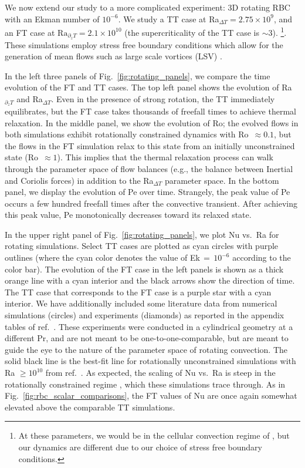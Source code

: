 \documentclass[aps, pre, onecolumn, nofootinbib, notitlepage, groupedaddress, amsfonts, amssymb, amsmath, longbibliography, superscriptaddress]{revtex4-1}
\newcommand{\ea}[1]{{\color{red} #1}}
\begin{document}
We now extend our study to a more complicated experiment: 3D rotating RBC with an Ekman number of $10^{-6}$.
We study a TT case at Ra$_{\Delta T} = 2.75\times 10^9$, and an FT case at $\text{Ra}_{\partial_z T} = 2.1 \times 10^{10}$ (the supercriticality of the TT case is $\sim 3$).
\footnote{\ea{At these parameters, we would be in the cellular convection regime of \citet{stellmach&all2014}, but our dynamics are different due to our choice of stress free boundary conditions.
}}.
These simulations employ stress free boundary conditions which allow for the generation of mean flows such as large scale vortices (LSV) \ea{\citep{stellmach&all2014, rubio&all2014, guervilly&all2014, guervilly&hughes2017, favier&all2014, favier&all2019, couston&all2019}}.

In the left three panels of Fig.~\ref{fig:rotating_panels}, we compare the time evolution of the FT and TT cases.
The top left panel shows the evolution of Ra$_{\partial_z T}$ and Ra$_{\Delta T}$.
Even in the presence of strong rotation, the TT immediately equilibrates, but the FT case takes thousands of freefall times to achieve thermal relaxation.
In the middle panel, we show the evolution of Ro; the evolved flows in both simulations exhibit rotationally constrained dynamics with Ro $\,\approx 0.1$, but the flows in the FT simulation relax to this state from an initially unconstrained state (Ro $\,\approx 1$).
This implies that the thermal relaxation process can walk through the parameter space of flow balances (e.g., the balance between Inertial and Coriolis forces) in addition to the Ra$_{\Delta T}$ parameter space.
In the bottom panel, we display the evolution of Pe over time.
Strangely, the peak value of Pe occurs a few hundred freefall times after the convective transient.
After achieving this peak value, Pe monotonically decreases toward its relaxed state.

In the upper right panel of Fig.~\ref{fig:rotating_panels}, we plot Nu vs.~Ra for rotating simulations.
Select TT cases are plotted as cyan circles with purple outlines (where the cyan color denotes the value of Ek$\,=\,10^{-6}$ according to the color bar).
The evolution of the FT case in the left panels is shown as a thick orange line with a cyan interior and the black arrows show the direction of time.
The TT case that corresponds to the FT case is a purple star with a cyan interior.
We have additionally included some literature data from numerical simulations (circles) and experiments (diamonds) as reported in the appendix tables of ref.~\cite{cheng&all2015}.
These experiments were conducted in a cylindrical geometry at a different Pr, and are not meant to be one-to-one-comparable, but are meant to guide the eye to the nature of the parameter space of rotating convection.
The solid black line is the best-fit line for rotationally unconstrained simulations with Ra $\geq 10^{10}$ from ref.~\cite{cheng&all2015}.
As expected, the scaling of Nu vs.~Ra is steep in the rotationally constrained regime \cite{julien&all2012, plumley&julien2019}, which these simulations trace through.
As in Fig.~\ref{fig:rbc_scalar_comparisons}, the FT values of Nu are once again somewhat elevated above the comparable TT simulations.
\end{document}
